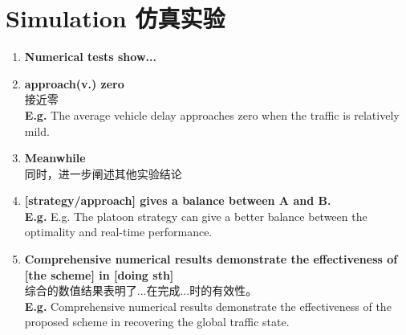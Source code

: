 \chapter{Simulation 仿真实验}

\begin{enumerate}
    
    \item \textbf{Numerical tests show...}
    
    \item \textbf{approach(v.) zero} \\ 接近零 
    \\
    \textbf{E.g.} The average vehicle delay approaches zero when the traffic is relatively mild.
    
    \item \textbf{Meanwhile} \\ 同时，进一步阐述其他实验结论
    
    \item \textbf{[strategy/approach] gives a balance between A and B.}  
    \\
    \textbf{E.g.} E.g. The platoon strategy can give a better balance between the optimality and real-time performance.
    
    \item \textbf{Comprehensive numerical results demonstrate the effectiveness of [the scheme] in [doing sth]} 
    \\ 综合的数值结果表明了...在完成...时的有效性。
    \\ \textbf{E.g.} Comprehensive numerical results demonstrate the effectiveness of the proposed scheme in recovering the global traffic state.
    
    
    
\end{enumerate}